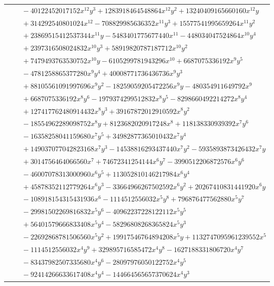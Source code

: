 \documentclass[11pt]{article}
\begin{document}
\begin{longtable}{@{}ll@{}}
 & $\quad -40122452017152x^{12}y^{3}+1283918464548864x^{12}y^{2}+13240409165660160x^{12}y$\\
 & $\quad +314292540801024x^{12}-708829985636352x^{11}y^{3}+15577541995659264x^{11}y^{2}$\\
 & $\quad +23869515412537344x^{11}y-5483401775677440x^{11}-448034047524864x^{10}y^{4}$\\
 & $\quad +2397316508024832x^{10}y^{3}+58919820787187712x^{10}y^{2}$\\
 & $\quad +7479493763530752x^{10}y-6105299781943296x^{10}+6687075336192x^{9}y^{5}$\\
 & $\quad -4781258865377280x^{9}y^{4}+40008771736436736x^{9}y^{3}$\\
 & $\quad +88105561091997696x^{9}y^{2}-18259059205472256x^{9}y-480354911649792x^{9}$\\
 & $\quad +6687075336192x^{8}y^{6}-1979374299512832x^{8}y^{5}-8298660492214272x^{8}y^{4}$\\
 & $\quad +127417762480914432x^{8}y^{3}+39167872012910592x^{8}y^{2}$\\
 & $\quad -18554962289098752x^{8}y+8123682020917248x^{8}+118138330939392x^{7}y^{6}$\\
 & $\quad -16358258041159680x^{7}y^{5}+34982877365010432x^{7}y^{4}$\\
 & $\quad +149037077042823168x^{7}y^{3}-14538816293437440x^{7}y^{2}-5935893873426432x^{7}y$\\
 & $\quad +3014756464066560x^{7}+74672341254144x^{6}y^{7}-3990512206872576x^{6}y^{6}$\\
 & $\quad -46007078313000960x^{6}y^{5}+113052810146217984x^{6}y^{4}$\\
 & $\quad +45878352112779264x^{6}y^{3}-33664966267502592x^{6}y^{2}+20267410831441920x^{6}y$\\
 & $\quad -108918154315431936x^{6}-1114512556032x^{5}y^{8}+796876477562880x^{5}y^{7}$\\
 & $\quad -29981502269816832x^{5}y^{6}-40962237228122112x^{5}y^{5}$\\
 & $\quad +56401579666833408x^{5}y^{4}-58296808268365824x^{5}y^{3}$\\
 & $\quad -22692868781506560x^{5}y^{2}+19917546764894208x^{5}y+1132747095961239552x^{5}$\\
 & $\quad -1114512556032x^{4}y^{9}+329895716585472x^{4}y^{8}-1627188331806720x^{4}y^{7}$\\
 & $\quad -83437982507335680x^{4}y^{6}-28097976050122752x^{4}y^{5}$\\
 & $\quad -92414266633617408x^{4}y^{4}-144664565657370624x^{4}y^{3}$\\

\end{longtable}
\end{document}
